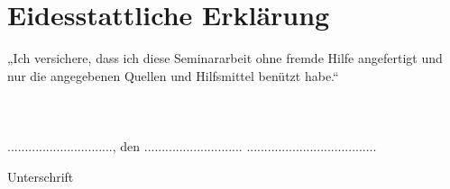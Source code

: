 \documentclass[12pt]{scrartcl} %
\begin{document}
\newpage
\section*{Eidesstattliche Erklärung}
\thispagestyle{empty}
\vfill
„Ich versichere, dass ich diese Seminararbeit ohne fremde Hilfe angefertigt und nur die angegebenen Quellen und Hilfsmittel benützt habe.“\\
\\
\\
\\
.............................., den ............................ \hfill .....................................\\
\begin{flushright}
Unterschrift
\end{flushright}
\end{document}
